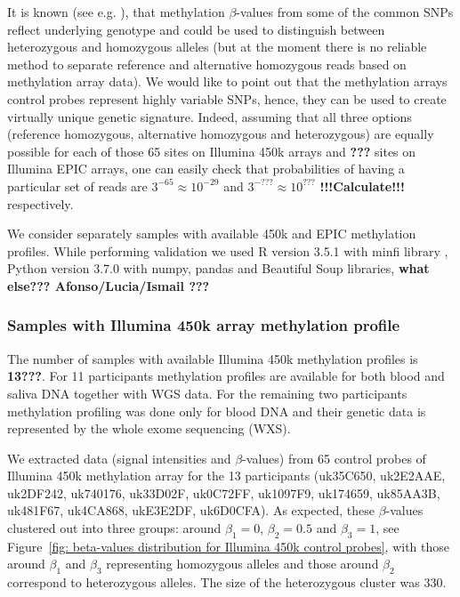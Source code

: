 \documentclass[english]{article}
\begin{document}
It is known (see e.g. \cite{chen2013discovery}), that methylation $\beta$-values from some of the common SNPs reflect underlying genotype and could be used to distinguish between heterozygous and homozygous alleles (but at the moment there is no reliable method to separate reference and alternative homozygous reads based on methylation array data). We would like to point out that the methylation arrays control probes represent highly variable SNPs, hence, they can be used to create virtually unique genetic signature. Indeed, assuming that all three options (reference homozygous, alternative homozygous and heterozygous) are equally possible for each of those 65 sites on Illumina 450k arrays and \textbf{???} sites on Illumina EPIC arrays, one can easily check that probabilities of having a particular set of reads are $3^{-65}\approx10^{-29}$ and $3^{-???}\approx10^{???}$ \textbf{!!!Calculate!!!} respectively.

We consider separately samples with available 450k and EPIC methylation profiles. While performing validation we used R version 3.5.1 with minfi library \cite{minfi}, Python version 3.7.0 with numpy, pandas and Beautiful Soup libraries, \textbf{what else??? Afonso/Lucia/Ismail ???}

\subsubsection*{Samples with Illumina 450k array methylation profile}
The number of samples with available Illumina 450k methylation profiles is \textbf{13???}. For 11 participants methylation profiles are available for both blood and saliva DNA together with WGS data. For the remaining two participants methylation profiling was done only for blood DNA and their genetic data is represented by the whole exome sequencing (WXS).

We extracted data (signal intensities and $\beta$-values) from 65 control probes of Illumina 450k methylation array for the 13 participants (uk35C650, uk2E2AAE, uk2DF242, uk740176, uk33D02F, uk0C72FF, uk1097F9, uk174659, uk85AA3B, uk481F67, uk4CA868, ukE3E2DF, uk6D0CFA). As expected, these $\beta$-values clustered out into three groups: around $\beta_1 = 0$, $\beta_2=0.5$ and $\beta_3=1$, see Figure~\ref{fig: beta-values distribution for Illumina 450k control probes}, with those around $\beta_1$ and $\beta_3$ representing homozygous alleles and those around $\beta_2$ correspond to heterozygous alleles. The size of the heterozygous cluster was 330. 
\end{document}
